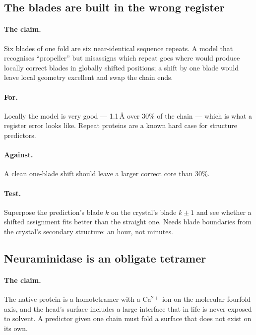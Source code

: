 \documentclass[11pt,a4paper]{article}
\begin{document}
\subsection{The blades are built in the wrong register}

\paragraph{The claim.} Six blades of one fold are six near-identical sequence
repeats. A model that recognises ``propeller'' but misassigns which repeat goes
where would produce locally correct blades in globally shifted positions; a shift
by one blade would leave local geometry excellent and swap the chain ends.

\paragraph{For.} Locally the model is very good --- 1.1\,\AA{} over 30\% of the
chain --- which is what a register error looks like. Repeat proteins are a known
hard case for structure predictors.

\paragraph{Against.} A clean one-blade shift should leave a larger correct core
than 30\%.

\paragraph{Test.} Superpose the prediction's blade $k$ on the crystal's blade
$k\pm1$ and see whether a shifted assignment fits better than the straight one.
Needs blade boundaries from the crystal's secondary structure: an hour, not
minutes.

\subsection{Neuraminidase is an obligate tetramer}

\paragraph{The claim.} The native protein is a homotetramer with a Ca$^{2+}$ ion
on the molecular fourfold axis, and the head's surface includes a large interface
that in life is never exposed to solvent. A predictor given one chain must fold a
surface that does not exist on its own.
\end{document}
